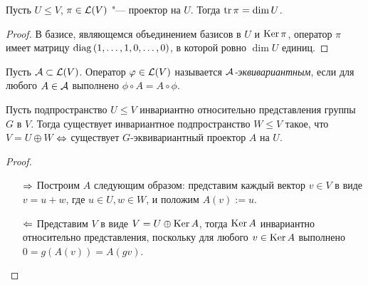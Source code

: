\begin{corollary}
	Пусть $U \le V$, $\pi \in \mathcal L(V)$ "--- проектор на $U$. Тогда $\operatorname{tr}\pi = \dim{U}$.
\end{corollary}

\begin{proof}
	В базисе, являющемся объединением базисов в $U$ и $\operatorname{Ker}\pi$, оператор $\pi$ имеет матрицу $\operatorname{diag}{(1, \dotsc, 1, 0, \dotsc, 0)}$, в которой ровно $\dim{U}$ единиц.
\end{proof}

\begin{definition}
	Пусть $\mathcal A\subset \mathcal L(V)$. Оператор $\varphi \in \mathcal L(V)$ называется \textit{$\mathcal A$-эквивариантным}, если для любого $A \in \mathcal A$ выполнено $\phi \circ A = A \circ \phi$.
\end{definition}

\begin{proposition}
	Пусть подпространство $U \le V$ инвариантно относительно представления группы $G$ в $V$. Тогда существует инвариантное подпространство $W \le V$ такое, что $V = U \oplus W$ $\Leftrightarrow$ существует $G$-эквивариантный проектор $A$ на $U$.
\end{proposition}

\begin{proof}~
	\begin{enumerate}
		\item[$\Rightarrow$] Построим $A$ следующим образом: представим каждый вектор $v \in V$ в виде $v = u + w$, где $u \in U, w \in W$, и положим $A(v) := u$.
		\item[$\Leftarrow$] Представим $V$ в виде $V = U \oplus \operatorname{Ker}{A}$, тогда $\operatorname{Ker}{A}$ инвариантно относительно представления, поскольку для любого $v \in \operatorname{Ker}{A}$ выполнено $0 = g(A(v)) = A(gv)$.\qedhere
	\end{enumerate}
\end{proof}
